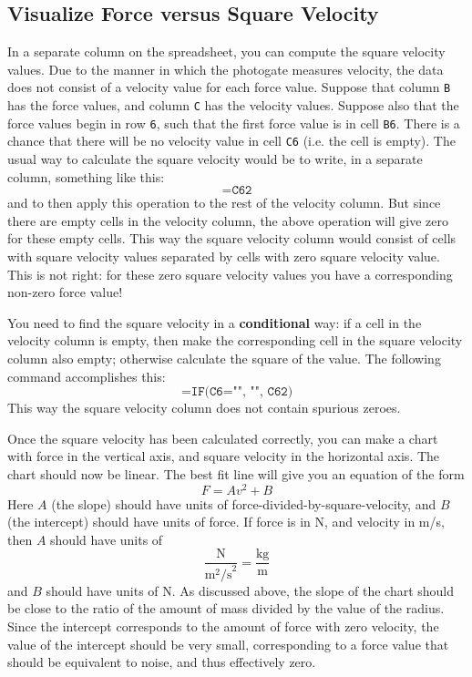 \subsection{Visualize Force versus Square Velocity}
%
In a separate column on the spreadsheet, you can compute the square velocity values. Due to the manner in which the photogate measures velocity, the data does not consist of a velocity value for each force value. Suppose that column \texttt{B} has the force values, and column \texttt{C} has the velocity values. Suppose also that the force values begin in row \texttt{6}, such that the first force value is in cell \texttt{B6}. There is a chance that there will be no velocity value in cell \texttt{C6} (i.e. the cell is empty). The usual way to calculate the square velocity would be to write, in a separate column, something like this:
\begin{equation}
    \texttt{=C6\^{}2}
\end{equation}
and to then apply this operation to the rest of the velocity column. But since there are empty cells in the velocity column, the above operation will give zero for these empty cells. This way the square velocity column would consist of cells with square velocity values separated by cells with zero square velocity value. This is not right: for these zero square velocity values you have a corresponding non-zero force value!

You need to find the square velocity in a \textbf{conditional} way: if a cell in the velocity column is empty, then make the corresponding cell in the square velocity column also empty; otherwise calculate the square of the value. The following command accomplishes this:
\begin{equation}
    \texttt{=IF(C6="", "", C6\^{}2)}
\end{equation}
This way the square velocity column does not contain spurious zeroes.

Once the square velocity has been calculated correctly, you can make a chart with force in the vertical axis, and square velocity in the horizontal axis. The chart should now be linear. The best fit line will give you an equation of the form
\begin{equation}
    F = A v^{2} + B
\end{equation}
Here $A$ (the slope) should have units of force-divided-by-square-velocity, and $B$ (the intercept) should have units of force. If force is in N, and velocity in m/s, then $A$ should have units of
\begin{equation}
    \frac{\text{N}}{\text{m}^{2}\text{/s}^{2}} = \frac{\text{kg}}{\text{m}}
\end{equation}
and $B$ should have units of N. As discussed above, the slope of the chart should be close to the ratio of the amount of mass divided by the value of the radius. Since the intercept corresponds to the amount of force with zero velocity, the value of the intercept should be very small, corresponding to a force value that should be equivalent to noise, and thus effectively zero.
%
